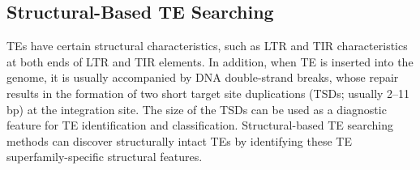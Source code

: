 \documentclass{bmcart}
\begin{document}
%
%
%

\subsection*{Structural-Based TE Searching}
TEs have certain structural characteristics, such as LTR and TIR characteristics at both ends of LTR and TIR elements. In addition, when TE is inserted into the genome, it is usually accompanied by DNA double-strand breaks, whose repair results in the formation of two short target site duplications (TSDs; usually 2–11 bp) at the integration site. The size of the TSDs can be used as a diagnostic feature for TE identification and classification. Structural-based TE searching methods can discover structurally intact TEs by identifying these TE superfamily-specific structural features. %
\end{document}
